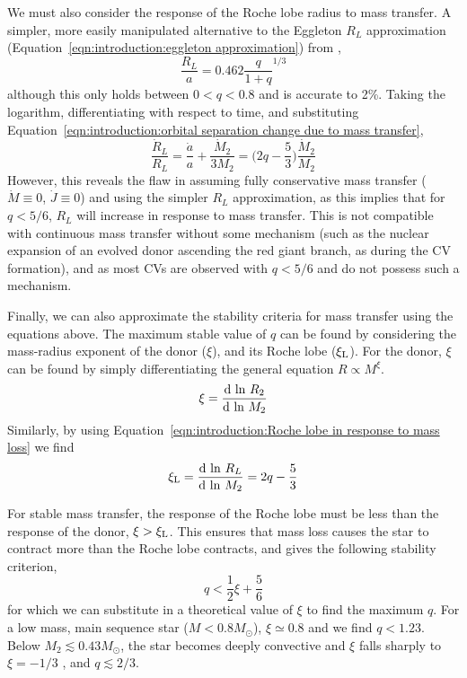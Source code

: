 We must also consider the response of the Roche lobe radius to mass transfer.
A simpler, more easily manipulated alternative to the Eggleton $R_L$ approximation (Equation~\ref{eqn:introduction:eggleton approximation}) from \citep{paczynski1971},
\begin{equation}
    \frac{R_L}{a} = 0.462 \frac{q}{1 + q}^{1/3}
\end{equation}
although this only holds between $0 < q < 0.8$ and is accurate to 2\%. Taking the logarithm, differentiating with respect to time, and substituting Equation~\ref{eqn:introduction:orbital separation change due to mass transfer},
\begin{equation}
    \label{eqn:introduction:Roche lobe in response to mass loss}
    \frac{\dot R_L}{R_L} = \frac{\dot a}{a} + \frac{\dot M_2}{3 M_2} = \bigg ( 2q - \frac{5}{3} \bigg )\frac{\dot M_2}{M_2}
\end{equation}
However, this reveals the flaw in assuming fully conservative mass transfer ($\dot M \equiv 0$, $\dot J \equiv 0$) and using the simpler $R_L$ approximation, as this implies that for $q < 5/6$, $R_L$ will increase in response to mass transfer. This is not compatible with continuous mass transfer without some mechanism (such as the nuclear expansion of an evolved donor ascending the red giant branch, as during the CV formation), and as most CVs are observed with $q < 5/6$ and do not possess such a mechanism.

Finally, we can also approximate the stability criteria for mass transfer using the equations above.
The maximum stable value of $q$ can be found by considering the mass-radius exponent of the donor ($\xi$), and its Roche lobe ($\xi_{\rm L}$). For the donor, $\xi$ can be found by simply differentiating the general equation $R \propto M^\xi$.
\begin{equation}
    \xi = \frac{{\rm d\ ln\ }R_2}{{\rm d\ ln\ }M_2}
\end{equation}
Similarly, by using Equation~\ref{eqn:introduction:Roche lobe in response to mass loss} we find
\begin{equation}
    \xi_{\rm L} = \frac{{\rm d\ ln\ }R_L}{{\rm d\ ln\ }M_2} = 2q - \frac{5}{3}
\end{equation}

For stable mass transfer, the response of the Roche lobe must be less than the response of the donor, $\xi > \xi_{\rm L}$. This ensures that mass loss causes the star to contract more than the Roche lobe contracts, and gives the following stability criterion,
\begin{equation}
    q < \frac{1}{2}\xi + \frac{5}{6}
\end{equation}
for which we can substitute in a theoretical value of $\xi$ to find the maximum $q$. For a low mass, main sequence star ($M < 0.8M_\odot$), $\xi \simeq 0.8$ \citep{knigge11} and we find $q < 1.23$. Below $M_2 \lesssim 0.43 M_\odot$, the star becomes deeply convective and $\xi$ falls sharply to $\xi = -1/3$ \citep{paczynski1965,rappaport1982}, and $q \lesssim 2/3$.


